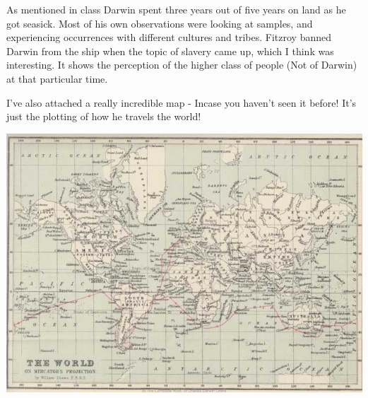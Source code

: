 \documentclass[11pt, oneside]{article}   	%
\begin{document}
\par As mentioned in class Darwin spent three years out of five years on land as he got seasick. Most of his own observations were looking at samples, and experiencing occurrences with different cultures and tribes. Fitzroy banned Darwin from the ship when the topic of slavery came up, which I think was interesting. It shows the perception of the higher class of people (Not of Darwin) at that particular time. 

\par I've also attached a really incredible map - Incase you haven't seen it before! It's just the plotting of how he travels the world!

\par 

\par \includegraphics[scale=0.6]{map.jpg}
\end{document}
